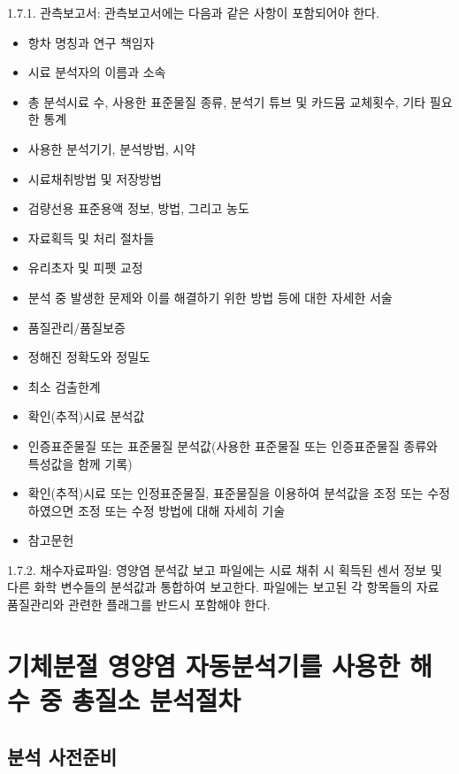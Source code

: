 \documentclass[
]{book}
\providecommand{\tightlist}{%
  \setlength{\itemsep}{0pt}\setlength{\parskip}{0pt}}
\begin{document}
1.7.1. 관측보고서: 관측보고서에는 다음과 같은 사항이 포함되어야 한다.

\begin{itemize}
\tightlist
\item
  항차 명칭과 연구 책임자
\item
  시료 분석자의 이름과 소속
\item
  총 분석시료 수, 사용한 표준물질 종류, 분석기 튜브 및 카드뮴 교체횟수, 기타 필요한 통계
\item
  사용한 분석기기, 분석방법, 시약
\item
  시료채취방법 및 저장방법
\item
  검량선용 표준용액 정보, 방법, 그리고 농도
\item
  자료획득 및 처리 절차들
\item
  유리초자 및 피펫 교정
\item
  분석 중 발생한 문제와 이를 해결하기 위한 방법 등에 대한 자세한 서술
\item
  품질관리/품질보증
\item
  정해진 정확도와 정밀도
\item
  최소 검출한계
\item
  확인(추적)시료 분석값
\item
  인증표준물질 또는 표준물질 분석값(사용한 표준물질 또는 인증표준물질 종류와 특성값을 함께 기록)
\item
  확인(추적)시료 또는 인정표준물질, 표준물질을 이용하여 분석값을 조정 또는 수정하였으면 조정 또는 수정 방법에 대해 자세히 기술
\item
  참고문헌
\end{itemize}

1.7.2. 채수자료파일: 영양염 분석값 보고 파일에는 시료 채취 시 획득된 센서 정보 및 다른 화학 변수들의 분석값과 통합하여 보고한다. 파일에는 보고된 각 항목들의 자료 품질관리와 관련한 플래그를 반드시 포함해야 한다.

\hypertarget{uxae30uxccb4uxbd84uxc808-uxc601uxc591uxc5fc-uxc790uxb3d9uxbd84uxc11duxae30uxb97c-uxc0acuxc6a9uxd55c-uxd574uxc218-uxc911-uxcd1duxc9c8uxc18c-uxbd84uxc11duxc808uxcc28-1}{%
\section{기체분절 영양염 자동분석기를 사용한 해수 중 총질소 분석절차}\label{uxae30uxccb4uxbd84uxc808-uxc601uxc591uxc5fc-uxc790uxb3d9uxbd84uxc11duxae30uxb97c-uxc0acuxc6a9uxd55c-uxd574uxc218-uxc911-uxcd1duxc9c8uxc18c-uxbd84uxc11duxc808uxcc28-1}}

\hypertarget{uxbd84uxc11d-uxc0acuxc804uxc900uxbe44-1}{%
\subsection{분석 사전준비}\label{uxbd84uxc11d-uxc0acuxc804uxc900uxbe44-1}}
\end{document}
